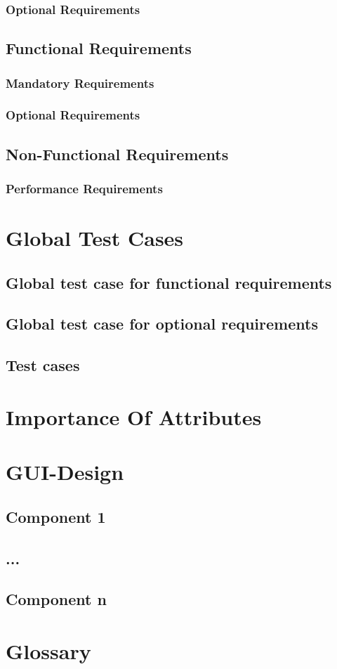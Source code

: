 \documentclass[10pt,a4paper]{report}
\begin{document}
\subsection{Optional Requirements}
\section{Functional Requirements}
\subsection{Mandatory Requirements}
\subsection{Optional Requirements}
\section{Non-Functional Requirements}
\subsection{Performance Requirements}

\chapter{Global Test Cases}
\section{Global test case for functional requirements}
\section{Global test case for optional requirements}
\section{Test cases}

\chapter{Importance Of Attributes}

\chapter{GUI-Design}
\section{Component 1}
\section{...}
\section{Component n}

\chapter{Glossary}
\end{document}
